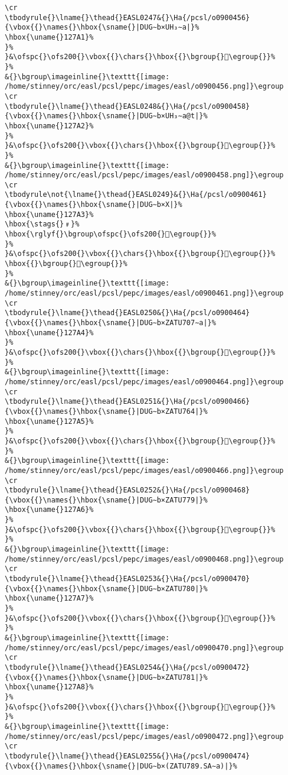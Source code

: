 \begin{verbatim}
\cr
\tbodyrule{}\lname{}\thead{}EASL0247&{}\Ha{/pcsl/o0900456}{\vbox{{}\names{}\hbox{\sname{}|DUG∼b×UH₃∼a|}%
\hbox{\uname{}127A1}%
}%
}&\ofspc{}\ofs200{}\vbox{{}\chars{}\hbox{{}\bgroup{}𒞡\egroup{}}%
}%
&{}\bgroup\imageinline{}\texttt{[image: /home/stinney/orc/easl/pcsl/pepc/images/easl/o0900456.png]}\egroup
\cr
\tbodyrule{}\lname{}\thead{}EASL0248&{}\Ha{/pcsl/o0900458}{\vbox{{}\names{}\hbox{\sname{}|DUG∼b×UH₃∼a@t|}%
\hbox{\uname{}127A2}%
}%
}&\ofspc{}\ofs200{}\vbox{{}\chars{}\hbox{{}\bgroup{}𒞢\egroup{}}%
}%
&{}\bgroup\imageinline{}\texttt{[image: /home/stinney/orc/easl/pcsl/pepc/images/easl/o0900458.png]}\egroup
\cr
\tbodyrule\not{\lname{}\thead{}EASL0249}&{}\Ha{/pcsl/o0900461}{\vbox{{}\names{}\hbox{\sname{}|DUG∼b×X|}%
\hbox{\uname{}127A3}%
\hbox{\stags{}﹟}%
\hbox{\rglyf{}\bgroup\ofspc{}\ofs200{}𒞣\egroup{}}%
}%
}&\ofspc{}\ofs200{}\vbox{{}\chars{}\hbox{{}\bgroup{}𒞷\egroup{}}%
\hbox{{}\bgroup{}𒞣\egroup{}}%
}%
&{}\bgroup\imageinline{}\texttt{[image: /home/stinney/orc/easl/pcsl/pepc/images/easl/o0900461.png]}\egroup
\cr
\tbodyrule{}\lname{}\thead{}EASL0250&{}\Ha{/pcsl/o0900464}{\vbox{{}\names{}\hbox{\sname{}|DUG∼b×ZATU707∼a|}%
\hbox{\uname{}127A4}%
}%
}&\ofspc{}\ofs200{}\vbox{{}\chars{}\hbox{{}\bgroup{}𒞤\egroup{}}%
}%
&{}\bgroup\imageinline{}\texttt{[image: /home/stinney/orc/easl/pcsl/pepc/images/easl/o0900464.png]}\egroup
\cr
\tbodyrule{}\lname{}\thead{}EASL0251&{}\Ha{/pcsl/o0900466}{\vbox{{}\names{}\hbox{\sname{}|DUG∼b×ZATU764|}%
\hbox{\uname{}127A5}%
}%
}&\ofspc{}\ofs200{}\vbox{{}\chars{}\hbox{{}\bgroup{}𒞥\egroup{}}%
}%
&{}\bgroup\imageinline{}\texttt{[image: /home/stinney/orc/easl/pcsl/pepc/images/easl/o0900466.png]}\egroup
\cr
\tbodyrule{}\lname{}\thead{}EASL0252&{}\Ha{/pcsl/o0900468}{\vbox{{}\names{}\hbox{\sname{}|DUG∼b×ZATU779|}%
\hbox{\uname{}127A6}%
}%
}&\ofspc{}\ofs200{}\vbox{{}\chars{}\hbox{{}\bgroup{}𒞦\egroup{}}%
}%
&{}\bgroup\imageinline{}\texttt{[image: /home/stinney/orc/easl/pcsl/pepc/images/easl/o0900468.png]}\egroup
\cr
\tbodyrule{}\lname{}\thead{}EASL0253&{}\Ha{/pcsl/o0900470}{\vbox{{}\names{}\hbox{\sname{}|DUG∼b×ZATU780|}%
\hbox{\uname{}127A7}%
}%
}&\ofspc{}\ofs200{}\vbox{{}\chars{}\hbox{{}\bgroup{}𒞧\egroup{}}%
}%
&{}\bgroup\imageinline{}\texttt{[image: /home/stinney/orc/easl/pcsl/pepc/images/easl/o0900470.png]}\egroup
\cr
\tbodyrule{}\lname{}\thead{}EASL0254&{}\Ha{/pcsl/o0900472}{\vbox{{}\names{}\hbox{\sname{}|DUG∼b×ZATU781|}%
\hbox{\uname{}127A8}%
}%
}&\ofspc{}\ofs200{}\vbox{{}\chars{}\hbox{{}\bgroup{}𒞨\egroup{}}%
}%
&{}\bgroup\imageinline{}\texttt{[image: /home/stinney/orc/easl/pcsl/pepc/images/easl/o0900472.png]}\egroup
\cr
\tbodyrule{}\lname{}\thead{}EASL0255&{}\Ha{/pcsl/o0900474}{\vbox{{}\names{}\hbox{\sname{}|DUG∼b×(ZATU789.SA∼a)|}%

\end{verbatim}
